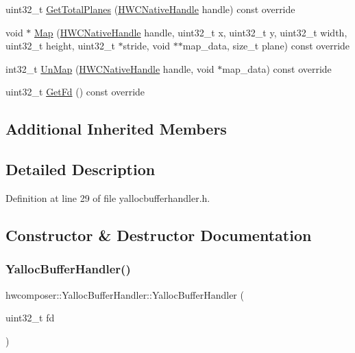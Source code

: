 \begin{DoxyCompactItemize}
\item 
uint32\+\_\+t \mbox{\hyperlink{classhwcomposer_1_1YallocBufferHandler_a257b6f65f6c57915ecabb0b6ecd43237}{Get\+Total\+Planes}} (\mbox{\hyperlink{alios_2platformdefines_8h_ac0a2eaf260f556d17fe489911f017bdf}{H\+W\+C\+Native\+Handle}} handle) const override
\item 
void $\ast$ \mbox{\hyperlink{classhwcomposer_1_1YallocBufferHandler_a855e524c54da7c897dfeb8dfabfdb29a}{Map}} (\mbox{\hyperlink{alios_2platformdefines_8h_ac0a2eaf260f556d17fe489911f017bdf}{H\+W\+C\+Native\+Handle}} handle, uint32\+\_\+t x, uint32\+\_\+t y, uint32\+\_\+t width, uint32\+\_\+t height, uint32\+\_\+t $\ast$stride, void $\ast$$\ast$map\+\_\+data, size\+\_\+t plane) const override
\item 
int32\+\_\+t \mbox{\hyperlink{classhwcomposer_1_1YallocBufferHandler_aea0fe826446e533862bea12e882c59ba}{Un\+Map}} (\mbox{\hyperlink{alios_2platformdefines_8h_ac0a2eaf260f556d17fe489911f017bdf}{H\+W\+C\+Native\+Handle}} handle, void $\ast$map\+\_\+data) const override
\item 
uint32\+\_\+t \mbox{\hyperlink{classhwcomposer_1_1YallocBufferHandler_a793b507e933f4cd256ea37e302152bb4}{Get\+Fd}} () const override
\end{DoxyCompactItemize}
\subsection*{Additional Inherited Members}


\subsection{Detailed Description}


Definition at line 29 of file yallocbufferhandler.\+h.



\subsection{Constructor \& Destructor Documentation}
\mbox{\label{classhwcomposer_1_1YallocBufferHandler_adc3ffd722ea3f127968d3f630c4613cc}} 
\subsubsection{\texorpdfstring{Yalloc\+Buffer\+Handler()}{YallocBufferHandler()}}
{\footnotesize\ttfamily hwcomposer\+::\+Yalloc\+Buffer\+Handler\+::\+Yalloc\+Buffer\+Handler (\begin{DoxyParamCaption}\item[{uint32\+\_\+t}]{fd }\end{DoxyParamCaption})\hspace{0.3cm}{\ttfamily [explicit]}}



